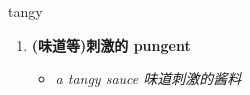 
\begin{frame}
{\huge tangy}
\begin{center}
\begin{enumerate}\Large
  \item \textbf{(味道等)刺激的 pungent}
  \begin{itemize}
    \item \em{\Large{a tangy sauce 味道刺激的酱料}}
  \end{itemize}
\end{enumerate}
\end{center}
\end{frame}
